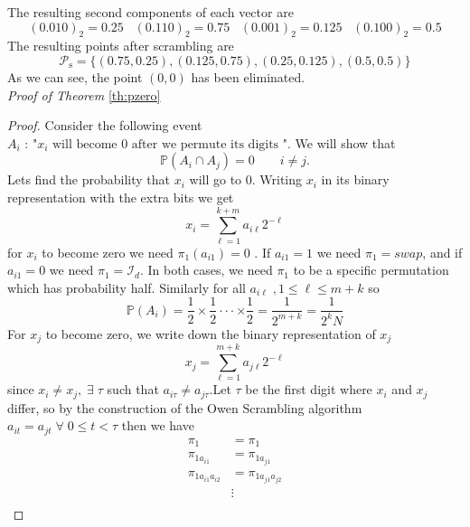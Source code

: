 \documentclass{article}
\theoremstyle{definition}
\begin{document}
\begin{appendices}
\begin{table}[H]
\end{table}
The resulting second components of each vector are \begin{equation}
    (0.010)_2=0.25\;\;\;(0.110)_2=0.75\;\;\;(0.001)_2=0.125\;\;\;(0.100)_2=0.5
\end{equation}
The resulting points after scrambling are \begin{equation}
    \mathcal{P}_{\text{s}}=\{(0.75,0.25),(0.125,0.75),(0.25,0.125),(0.5,0.5)\}
\end{equation}
As we can see, the point $(0,0)$ has been eliminated.\\
\textit{Proof of Theorem} \ref{th:pzero}
\begin{proof}
Consider the following event \(A_i \text{ : } \text{"}x_i \text{ will become 0 after we permute its digits "}\).
We will show that \begin{equation}
    \mathbb{P}(A_i \cap A_j)=0 \qquad i\neq j.
\end{equation}
Lets find the probability that $x_i$ will go to 0. Writing $x_i$ in its binary representation with the extra bits we get \begin{equation}
    x_i=\sum_{\ell=1}^{k+m}a_{i\ell}2^{-\ell}
\end{equation}
for $x_i$ to become zero we need $\pi_1(a_{i1})=0$ . If $a_{i1}=1$ we need $\pi_1=\textit{swap}$, and if $a_{i1}=0$ we need $\pi_1=\mathcal{I}_d$. In both cases, we need $\pi_1$ to be a specific permutation which has probability half. Similarly for all $a_{i\ell}\;, 1\leq \ell\leq m+k$ so \begin{equation}
    \mathbb{P}(A_i)=\frac{1}{2}\times \frac{1}{2}\cdot\cdot\cdot\times\frac{1}{2}=\frac{1}{2^{m+k}}=\frac{1}{2^{k}N}
\end{equation} 
For $x_j$ to become zero, we write down the binary representation of $x_j$ \begin{equation}
    x_j=\sum_{\ell=1}^{m+k}a_{j\ell}2^{-\ell}
\end{equation}
since $x_i \neq x_j, \; \exists\; \tau $ such that $a_{i\tau}\neq a_{j\tau} $.Let $\tau$ be the first digit where $x_i$ and $x_j$ differ, so by the construction of the Owen Scrambling algorithm $a_{it}=a_{jt}\; \forall\;  0\leq t< \tau $
then we have \begin{align*}
\pi_1&=\pi_1\\
\pi_{1a_{i1}}&=\pi_{1a_{j1}}\\
\pi_{1a_{i1}a_{i2}}&=\pi_{1a_{j1}a_{j2}}\\
&\vdots\\

\end{align*}
\end{proof}
\end{appendices}
\end{document}
